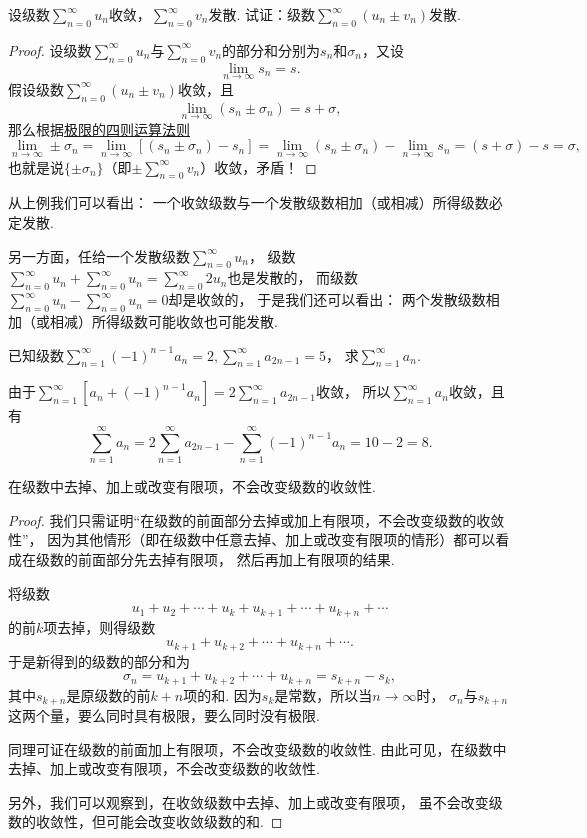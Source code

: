 \begin{example}
\def\s#1{\sum\limits_{#1}^\infty }
\def\l{\lim\limits_{n\to\infty}}
设级数\(\s{n=0} u_n\)收敛，\(\s{n=0} v_n\)发散.
试证：级数\(\s{n=0} (u_n \pm v_n)\)发散.
\begin{proof}
设级数\(\s{n=0} u_n\)与\(\s{n=0} v_n\)的部分和分别为\(s_n\)和\(\sigma_n\)，又设\[
\l s_n = s.
\]
假设级数\(\s{n=0} (u_n \pm v_n)\)收敛，且\[
\l (s_n \pm \sigma_n) = s+\sigma,
\]那么根据\hyperref[theorem:极限.极限的四则运算法则]{极限的四则运算法则}\[
\l \pm\sigma_n
= \l [(s_n \pm \sigma_n) - s_n]
= \l (s_n \pm \sigma_n) - \l s_n
= (s + \sigma) - s
= \sigma,
\]也就是说\(\{\pm\sigma_n\}\)（即\(\pm\s{n=0} v_n\)）收敛，矛盾！
\end{proof}
\end{example}
从上例我们可以看出：
{\color{red}一个收敛级数与一个发散级数相加（或相减）所得级数必定发散.}

{\def\s{\sum\limits_{n=0}^\infty }%
另一方面，任给一个发散级数\(\s u_n\)，
级数\(\s u_n + \s u_n
= \s 2 u_n\)也是发散的，
而级数\(\s u_n - \s u_n
= 0\)却是收敛的，
于是我们还可以看出：
\color{red}两个发散级数相加（或相减）所得级数可能收敛也可能发散.}

\begin{example}
已知级数\(\sum\limits_{n=1}^\infty (-1)^{n-1} a_n = 2,
\sum\limits_{n=1}^\infty a_{2n-1} = 5\)，
求\(\sum\limits_{n=1}^\infty a_n\).
\begin{solution}
由于\(\sum\limits_{n=1}^\infty [a_n + (-1)^{n-1} a_n]
= 2 \sum\limits_{n=1}^\infty a_{2n-1}\)收敛，
所以\(\sum\limits_{n=1}^\infty a_n\)收敛，且有
\[
\sum\limits_{n=1}^\infty a_n
= 2 \sum\limits_{n=1}^\infty a_{2n-1}
- \sum\limits_{n=1}^\infty (-1)^{n-1} a_n
= 10 - 2 = 8.
\]
\end{solution}
\end{example}

\begin{property}\label{theorem:无穷级数.收敛级数性质3}
在级数中去掉、加上或改变有限项，不会改变级数的收敛性.
\begin{proof}
我们只需证明“在级数的前面部分去掉或加上有限项，不会改变级数的收敛性”，
因为其他情形（即在级数中任意去掉、加上或改变有限项的情形）都可以看成在级数的前面部分先去掉有限项，
然后再加上有限项的结果.

将级数\[
u_1+u_2+\dotsb+u_k+u_{k+1}+\dotsb+u_{k+n}+\dotsb
\]的前\(k\)项去掉，则得级数\[
u_{k+1}+u_{k+2}+\dotsb+u_{k+n}+\dotsb.
\]于是新得到的级数的部分和为\[
\sigma_n = u_{k+1}+u_{k+2}+\dotsb+u_{k+n} = s_{k+n} - s_k,
\]其中\(s_{k+n}\)是原级数的前\(k+n\)项的和.
因为\(s_k\)是常数，所以当\(n\to\infty\)时，
\(\sigma_n\)与\(s_{k+n}\)这两个量，要么同时具有极限，要么同时没有极限.

同理可证在级数的前面加上有限项，不会改变级数的收敛性.
由此可见，在级数中去掉、加上或改变有限项，不会改变级数的收敛性.

另外，我们可以观察到，在收敛级数中去掉、加上或改变有限项，
虽不会改变级数的收敛性，但可能会改变收敛级数的和.
\end{proof}
\end{property}

